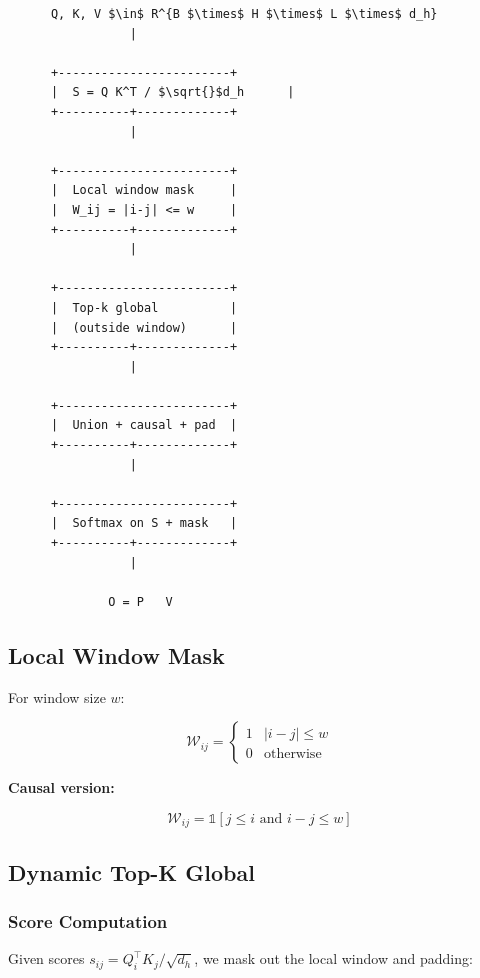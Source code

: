 \begin{lstlisting}
      Q, K, V $\in$ R^{B $\times$ H $\times$ L $\times$ d_h}
                 |
                  
      +------------------------+
      |  S = Q K^T / $\sqrt{}$d_h      |
      +----------+-------------+
                 |
                  
      +------------------------+
      |  Local window mask     |
      |  W_ij = |i-j| <= w     |
      +----------+-------------+
                 |
                  
      +------------------------+
      |  Top-k global          |
      |  (outside window)      |
      +----------+-------------+
                 |
                  
      +------------------------+
      |  Union + causal + pad  |
      +----------+-------------+
                 |
                  
      +------------------------+
      |  Softmax on S + mask   |
      +----------+-------------+
                 |
                  
              O = P   V
\end{lstlisting}

\subsection{Local Window Mask}

For window size $w$:

\[
\mathcal{W}_{ij} = \begin{cases} 1 & |i - j| \leq w \\ 0 & \text{otherwise} \end{cases}
\tag{4.1}
\]

\textbf{Causal version:}

\[
\mathcal{W}_{ij} = \mathbb{1}[j \leq i \text{ and } i - j \leq w]
\tag{4.2}
\]

\subsection{Dynamic Top-K Global}

\subsubsection{Score Computation}

Given scores $s_{ij} = Q_i^\top K_j / \sqrt{d_h}$, we mask out the local 
window and padding:

